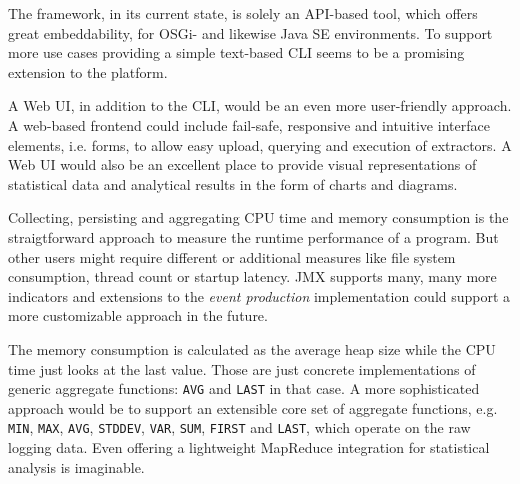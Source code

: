 The framework, in its current state, is solely an \gls{API}-based tool, which offers great embeddability, for \gls{OSGi}- and likewise Java SE environments. To support more use cases providing a simple text-based \gls{CLI} seems to be a promising extension to the platform.

A Web \gls{UI}, in addition to the \gls{CLI}, would be an even more user-friendly approach. A web-based frontend could include fail-safe, responsive and intuitive interface elements, i.e. forms, to allow easy upload, querying and execution of extractors. A Web \gls{UI} would also be an excellent place to provide visual representations of statistical data and analytical results in the form of charts and diagrams.

Collecting, persisting and aggregating CPU time and memory consumption is the straigtforward approach to measure the runtime performance of a program. But other users might require different or additional measures like file system consumption, thread count or startup latency. \gls{JMX} supports many, many more indicators and extensions to the \textit{event production} implementation could support a more customizable approach in the future.

The memory consumption is calculated as the average heap size while the CPU time just looks at the last value. Those are just concrete implementations of generic aggregate functions: \texttt{AVG} and \texttt{LAST} in that case. A more sophisticated approach would be to support an extensible core set of aggregate functions, e.g. \texttt{MIN}, \texttt{MAX}, \texttt{AVG}, \texttt{STDDEV}, \texttt{VAR}, \texttt{SUM}, \texttt{FIRST} and \texttt{LAST}, which operate on the raw logging data. Even offering a lightweight MapReduce integration for statistical analysis is imaginable.